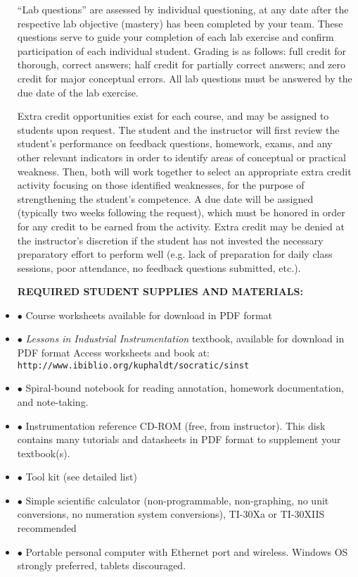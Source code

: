 \begin{itemize}
\vskip 10pt

``Lab questions'' are assessed by individual questioning, at any date after the respective lab objective (mastery) has been completed by your team.  These questions serve to guide your completion of each lab exercise and confirm participation of each individual student.  Grading is as follows: full credit for thorough, correct answers; half credit for partially correct answers; and zero credit for major conceptual errors.  All lab questions must be answered by the due date of the lab exercise.

\vskip 10pt

Extra credit opportunities exist for each course, and may be assigned to students upon request.  The student and the instructor will first review the student's performance on feedback questions, homework, exams, and any other relevant indicators in order to identify areas of conceptual or practical weakness.  Then, both will work together to select an appropriate extra credit activity focusing on those identified weaknesses, for the purpose of strengthening the student's competence.  A due date will be assigned (typically two weeks following the request), which must be honored in order for any credit to be earned from the activity.  Extra credit may be denied at the instructor's discretion if the student has not invested the necessary preparatory effort to perform well (e.g. lack of preparation for daily class sessions, poor attendance, no feedback questions submitted, etc.).


\vfil \eject

\noindent
{\bf REQUIRED STUDENT SUPPLIES AND MATERIALS:} 

\item{$\bullet$} Course worksheets available for download in PDF format
\item{$\bullet$} {\it Lessons in Industrial Instrumentation} textbook, available for download in PDF format
\itemitem{$\rightarrow$} Access worksheets and book at: {\tt http://www.ibiblio.org/kuphaldt/socratic/sinst}
\item{$\bullet$} Spiral-bound notebook for reading annotation, homework documentation, and note-taking.
\item{$\bullet$} Instrumentation reference CD-ROM (free, from instructor).  This disk contains many tutorials and datasheets in PDF format to supplement your textbook(s).
\item{$\bullet$} Tool kit (see detailed list)
\item{$\bullet$} Simple scientific calculator (non-programmable, non-graphing, no unit conversions, no numeration system conversions), TI-30Xa or TI-30XIIS recommended
\item{$\bullet$} Portable personal computer with Ethernet port and wireless.  Windows OS strongly preferred, tablets discouraged.


\end{itemize}
